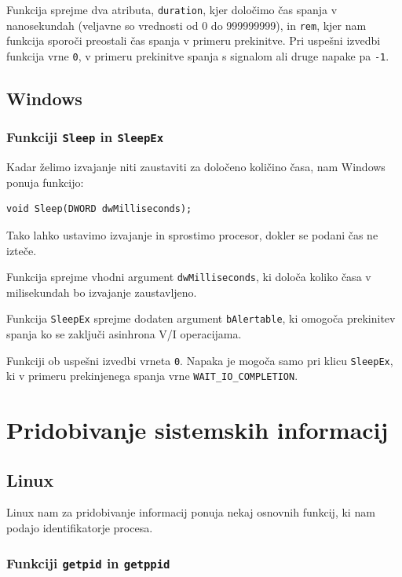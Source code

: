 \documentclass[a4paper,12pt,openright]{book}
\begin{document}
Funkcija sprejme dva atributa, \texttt{duration}, kjer določimo čas spanja v nanosekundah (veljavne so vrednosti od 0 do 999999999), in \texttt{rem}, kjer nam funkcija sporoči preostali čas spanja v primeru prekinitve.
Pri uspešni izvedbi funkcija vrne \texttt{0}, v primeru prekinitve spanja s signalom ali druge napake pa \texttt{-1}.

\subsection{Windows}

\subsubsection{Funkciji \texttt{Sleep} in \texttt{SleepEx}}

Kadar želimo izvajanje niti zaustaviti za določeno količino časa, nam Windows ponuja funkcijo:
\begin{lstlisting}[style=func]
 void Sleep(DWORD dwMilliseconds);
\end{lstlisting}
Tako lahko ustavimo izvajanje in sprostimo procesor, dokler se podani čas ne izteče.

Funkcija sprejme vhodni argument \texttt{dwMilliseconds}, ki določa koliko časa v milisekundah bo izvajanje zaustavljeno.

Funkcija \texttt{SleepEx} sprejme dodaten argument \texttt{bAlertable}, ki omogoča prekinitev spanja ko se zaključi asinhrona V/I operacijama.

Funkciji ob uspešni izvedbi vrneta \texttt{0}.
Napaka je mogoča samo pri klicu \texttt{SleepEx}, ki v primeru prekinjenega spanja vrne \texttt{WAIT\_IO\_COMPLETION}.

\section{Pridobivanje sistemskih informacij}

\subsection{Linux}

Linux nam za pridobivanje informacij ponuja nekaj osnovnih funkcij, ki nam podajo identifikatorje procesa.

\subsubsection{Funkciji \texttt{getpid} in \texttt{getppid}}
\end{document}
